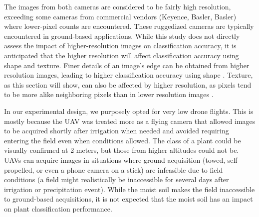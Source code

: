 \documentclass[letterpaper, notitlepage]{report}
\begin{document}
The images from both cameras are considered to be fairly high resolution, exceeding some cameras from commercial vendors (Keyence, Basler, Basler) where lower-pixel counts are encountered. These ruggedized cameras are typically encountered in ground-based applications. While this study does not directly assess the impact of higher-resolution images on classification accuracy, it is anticipated that the higher resolution will affect classification accuracy using shape and texture. Finer details of an image's edge can be obtained from higher resolution images, leading to higher classification accuracy using shape \parencite{Kroner2013-rm}. Texture, as this section will show, can also be affected by higher resolution, as pixels tend to be more alike neighboring pixels than in lower resolution images \parencite{Kupidura2022-xe}. 

In our experimental design, we purposely opted for very low drone flights. This is mostly because the UAV was treated more as a flying camera that allowed images to be acquired shortly after irrigation when needed and avoided requiring entering the field even when conditions allowed. The class of a plant could be visually confirmed at 2 meters, but those from higher altitudes could not be. UAVs can acquire images in situations where ground acquisition (towed, self-propelled, or even a phone camera on a stick) are infeasible due to field conditions (a field might realistically be inaccessible for several days after irrigation or precipitation event). While the moist soil makes the field inaccessible to ground-based acquisitions, it is not expected that the moist soil has an impact on plant classification performance.
\end{document}
